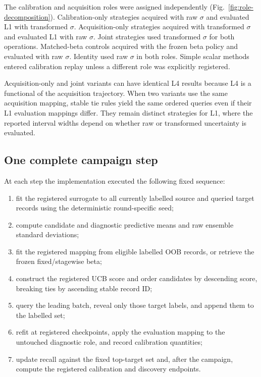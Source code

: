 \documentclass[10pt]{article}
\begin{document}
The calibration and acquisition roles were assigned independently
(Fig.~\ref{fig:role-decomposition}). Calibration-only strategies acquired with raw
$\sigma$ and evaluated L1 with transformed $\sigma$. Acquisition-only
strategies acquired with transformed $\sigma$ and evaluated L1 with raw
$\sigma$. Joint strategies used transformed $\sigma$ for both operations.
Matched-beta controls acquired with the frozen beta policy and evaluated with
raw $\sigma$. Identity used raw $\sigma$ in both roles. Simple scalar methods
entered calibration replay unless a different role was explicitly registered.

Acquisition-only and joint variants can have identical L4 results because L4
is a functional of the acquisition trajectory. When two variants use the same
acquisition mapping, stable tie rules yield the same ordered queries even if
their L1 evaluation mappings differ. They remain distinct strategies for L1,
where the reported interval widths depend on whether raw or transformed
uncertainty is evaluated.

\subsection{One complete campaign step}
At each step the implementation executed the following fixed sequence:
\begin{enumerate}
\item fit the registered surrogate to all currently labelled source and queried
target records using the deterministic round-specific seed;
\item compute candidate and diagnostic predictive means and raw ensemble
standard deviations;
\item fit the registered mapping from eligible labelled OOB records, or retrieve
the frozen fixed/stagewise beta;
\item construct the registered UCB score and order candidates by descending
score, breaking ties by ascending stable record ID;
\item query the leading batch, reveal only those target labels, and append them
to the labelled set;
\item refit at registered checkpoints, apply the evaluation mapping to the
untouched diagnostic role, and record calibration quantities;
\item update recall against the fixed top-target set and, after the campaign,
compute the registered calibration and discovery endpoints.
\end{enumerate}
\end{document}
